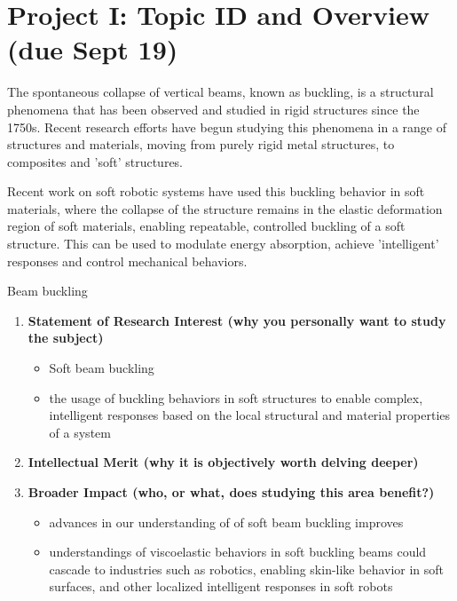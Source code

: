 
\section*{Project I: Topic ID and Overview (due Sept 19)}
The spontaneous collapse of vertical beams, known as buckling, is a structural phenomena that has been observed and studied in rigid structures since the 1750s. Recent research efforts have begun studying this phenomena in a range of structures and materials, moving from purely rigid metal structures, to composites and  'soft' structures. 

Recent work on soft robotic systems have used this buckling behavior in soft materials, where the collapse of the structure remains in the elastic deformation region of soft materials, enabling repeatable, controlled buckling of a soft structure. This can be used to modulate energy absorption, achieve 'intelligent' responses and control mechanical behaviors.

Beam buckling 

\begin{enumerate}
\item \textbf{Statement of Research Interest (why you personally want to study the subject)}
\begin{itemize}
\item Soft beam buckling 
\item the usage of buckling behaviors in soft structures to enable complex, intelligent responses based on the local structural and material properties of a system
\end{itemize}

\item \textbf{Intellectual Merit (why it is objectively worth delving deeper)}

\item \textbf{Broader Impact (who, or what, does studying this area benefit?)}
\begin{itemize}
    \item advances in our understanding of of soft beam buckling improves 
    \item understandings of viscoelastic behaviors in soft buckling beams could cascade to industries such as robotics, enabling skin-like behavior in soft surfaces, and other localized intelligent responses in soft robots
\end{itemize}

\end{enumerate}



